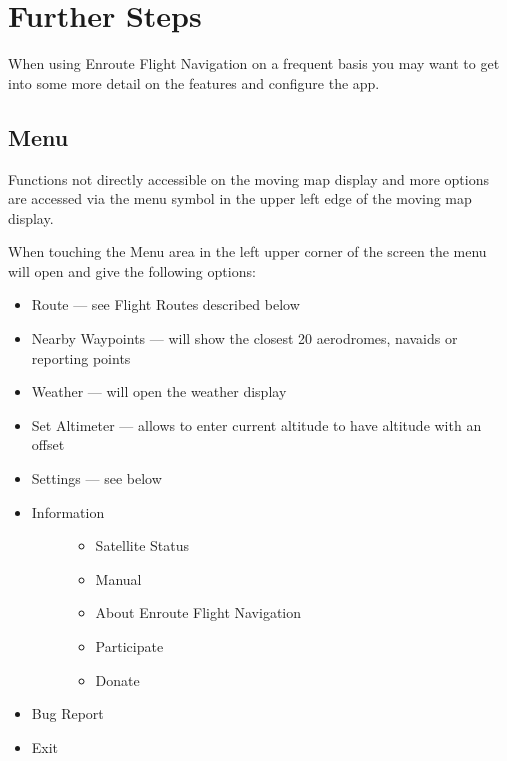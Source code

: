 \documentclass[letterpaper,10pt,english]{sphinxmanual}
\begin{document}
\chapter{Further Steps}
\label{\detokenize{01-intro/further_steps:further-steps}}\label{\detokenize{01-intro/further_steps::doc}}
When using Enroute Flight Navigation on a frequent basis you may want to get into some more detail on the features and configure the app.


\section{Menu}
\label{\detokenize{01-intro/further_steps:menu}}
Functions not directly accessible on the moving map display and more options are accessed via the menu symbol in the upper left edge of the moving map display.

When touching the Menu area in the left upper corner of the screen the menu will open and give the following options:
\begin{itemize}
\item {} 
Route — see Flight Routes described below

\item {} 
Nearby Waypoints  — will show the closest 20 aerodromes, navaids or reporting points

\item {} 
Weather   — will open the weather display

\item {} 
Set Altimeter — allows to enter current altitude to have altitude with an offset

\item {} 
Settings — see below

\item {} \begin{description}
\item[{Information}] \leavevmode\begin{itemize}
\item {} 
Satellite Status

\item {} 
Manual

\item {} 
About Enroute Flight Navigation

\item {} 
Participate

\item {} 
Donate

\end{itemize}

\end{description}

\item {} 
Bug Report

\item {} 
Exit

\end{itemize}
\end{document}
